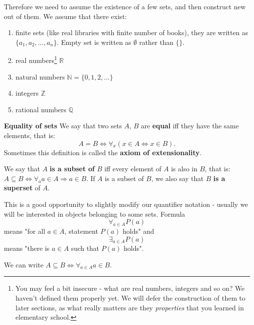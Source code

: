 Therefore we need to assume the existence of a few sets, and then construct new out of them. We assume that there exist:
\begin{enumerate}
  \item finite sets (like real libraries with finite number of books), they are written as $\{a_1,a_2,\dots,a_n\}$. Empty set is written as $\emptyset$ rather than $\{\}$.
	\item real numbers\footnote{You may feel a bit insecure - what are real numbers, integers and so on? We haven't defined them properly yet.
    We will defer the construction of them to later sections, as what really matters are they \textit{properties} that you learned in elementary school.} $\mathbb R$
	\item natural numbers $\mathbb N=\{0,1,2,\dots\}$
	\item integers $\mathbb Z$
	\item rational numbers $\mathbb Q$
\end{enumerate}

\begin{definition}
  \textbf{Equality of sets} We say that two sets $A$, $B$ are \textbf{equal} iff they have the same elements, that is:
  $$A=B\Leftrightarrow \forall_x (x\in A \Leftrightarrow x\in B).$$
  Sometimes this definition is called the \textbf{axiom of extensionality}.
\end{definition}

\begin{definition}
  We say that $A$ \textbf{is a subset of} $B$ iff every element of $A$ is also in $B$, that is:
  $A\subseteq B \Leftrightarrow \forall_a a\in A\Rightarrow a\in B$.
  If $A$ is a subset of $B$, we also say that $B$ \textbf{is a superset} of $A$.
\end{definition}

This is a good opportunity to slightly modify our quantifier notation - usually we will be interested in objects belonging to some sets.
Formula $$\forall_{a\in A} P(a)$$ means "for all $a\in A$, statement $P(a)$ holds"
and $$\exists_{a\in A} P(a)$$ means "there is $a\in A$ such that $P(a)$ holds".

\begin{example}
  We can write $A\subseteq B \Leftrightarrow \forall_{a\in A} a\in B$.
\end{example}

